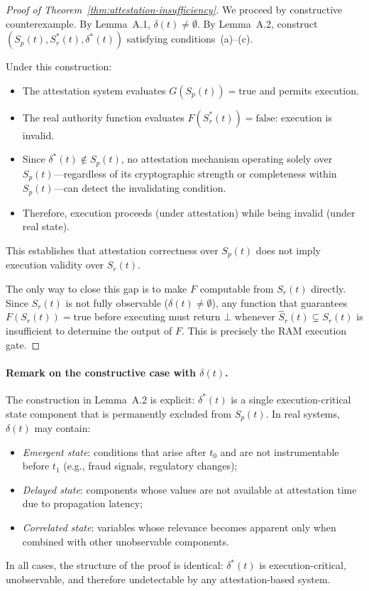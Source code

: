 \documentclass[11pt]{article}
\newcommand{\Sr}{S_r}
\newcommand{\Sp}{S_p}
\newcommand{\Ndefval}{\bot}
\begin{document}
\begin{proof}[Proof of Theorem~\ref{thm:attestation-insufficiency}]
We proceed by constructive counterexample.
By Lemma~A.1, $\delta(t) \neq \emptyset$.
By Lemma~A.2, construct $(\Sp(t), \Sr^*(t), \delta^*(t))$ satisfying
conditions~(a)--(c).

Under this construction:
\begin{itemize}
  \item The attestation system evaluates $G(\Sp(t)) = \text{true}$ and permits
        execution.
  \item The real authority function evaluates $F(\Sr^*(t)) = \text{false}$:
        execution is invalid.
  \item Since $\delta^*(t) \notin \Sp(t)$, no attestation mechanism operating
        solely over $\Sp(t)$---regardless of its cryptographic strength or
        completeness within $\Sp(t)$---can detect the invalidating condition.
  \item Therefore, execution proceeds (under attestation) while being invalid
        (under real state).
\end{itemize}

This establishes that attestation correctness over $\Sp(t)$ does not imply
execution validity over $\Sr(t)$.

The only way to close this gap is to make $F$ computable from $\Sr(t)$ directly.
Since $\Sr(t)$ is not fully observable ($\delta(t) \neq \emptyset$), any function
that guarantees $F(\Sr(t)) = \text{true}$ before executing must return
$\Ndefval$ whenever $\hat{S}_r(t) \subsetneq \Sr(t)$ is insufficient to
determine the output of $F$.
This is precisely the RAM execution gate.
\end{proof}

\paragraph{Remark on the constructive case with $\delta(t)$.}
The construction in Lemma~A.2 is explicit: $\delta^*(t)$ is a single
execution-critical state component that is permanently excluded from $\Sp(t)$.
In real systems, $\delta(t)$ may contain:
\begin{itemize}
  \item \textit{Emergent state}: conditions that arise after $t_0$ and are
        not instrumentable before $t_1$ (e.g., fraud signals, regulatory changes);
  \item \textit{Delayed state}: components whose values are not available at
        attestation time due to propagation latency;
  \item \textit{Correlated state}: variables whose relevance becomes apparent
        only when combined with other unobservable components.
\end{itemize}
In all cases, the structure of the proof is identical: $\delta^*(t)$ is
execution-critical, unobservable, and therefore undetectable by any
attestation-based system.



\end{document}
